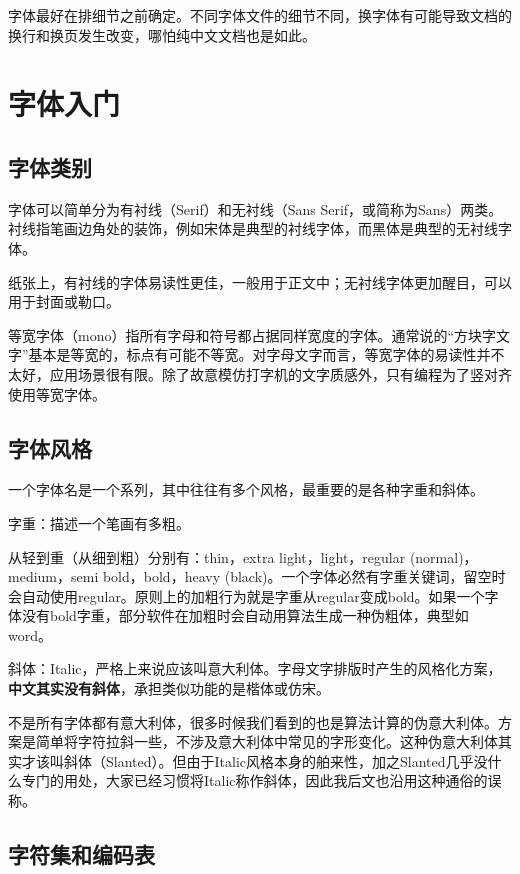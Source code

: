 \documentclass[10pt,openany]{book}
\begin{document}
\begin{sloppypar}
    字体最好在排细节之前确定。不同字体文件的细节不同，换字体有可能导致文档的换行和换页发生改变，哪怕纯中文文档也是如此。

    \section{字体入门}

    \subsection{字体类别}

    字体可以简单分为有衬线（Serif）和无衬线（Sans Serif，或简称为Sans）两类。衬线指笔画边角处的装饰，例如宋体是典型的衬线字体，而黑体是典型的无衬线字体。

    纸张上，有衬线的字体易读性更佳，一般用于正文中；无衬线字体更加醒目，可以用于封面或勒口。

    等宽字体（mono）指所有字母和符号都占据同样宽度的字体。通常说的“方块字文字”基本是等宽的，标点有可能不等宽。对字母文字而言，等宽字体的易读性并不太好，应用场景很有限。除了故意模仿打字机的文字质感外，只有编程为了竖对齐使用等宽字体。

    \subsection{字体风格}

    一个字体名是一个系列，其中往往有多个风格，最重要的是各种字重和斜体。

    字重：描述一个笔画有多粗。

    从轻到重（从细到粗）分别有：thin，extra light，light，regular (normal)，medium，semi bold，bold，heavy (black)。一个字体必然有字重关键词，留空时会自动使用regular。原则上的加粗行为就是字重从regular变成bold。如果一个字体没有bold字重，部分软件在加粗时会自动用算法生成一种伪粗体，典型如word。

    斜体：Italic，严格上来说应该叫意大利体。字母文字排版时产生的风格化方案，\textbf{中文其实没有斜体}，承担类似功能的是楷体或仿宋。

    不是所有字体都有意大利体，很多时候我们看到的也是算法计算的伪意大利体。方案是简单将字符拉斜一些，不涉及意大利体中常见的字形变化。这种伪意大利体其实才该叫斜体（Slanted）。但由于Italic风格本身的舶来性，加之Slanted几乎没什么专门的用处，大家已经习惯将Italic称作斜体，因此我后文也沿用这种通俗的误称。

    \subsection{字符集和编码表}


\end{sloppypar}
\end{document}
